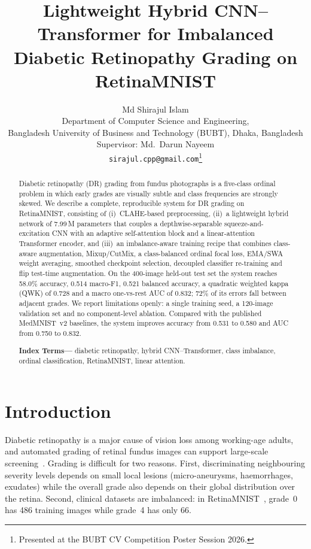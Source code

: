 \documentclass[10pt,twocolumn]{article}
\title{\vspace{-0.6em}\bfseries\fontsize{20}{23}\selectfont Lightweight Hybrid CNN--Transformer for Imbalanced Diabetic Retinopathy Grading on RetinaMNIST\vspace{-0.2em}}
\author{%
  \fontsize{11}{13}\selectfont Md Shirajul Islam\\[-1pt]
  \normalsize Department of Computer Science and Engineering,\\[-1pt]
  \normalsize Bangladesh University of Business and Technology (BUBT), Dhaka, Bangladesh\\[-1pt]
  \normalsize Supervisor: Md.\ Darun Nayeem\\[-1pt]
  \normalsize\texttt{sirajul.cpp@gmail.com}\thanks{Presented at the BUBT CV Competition Poster Session 2026.}}
\date{}
\begin{document}
\maketitle
\vspace{-1.2em}

\begin{abstract}
\noindent\small
Diabetic retinopathy (DR) grading from fundus photographs is a five-class ordinal problem in which early grades are visually subtle and class frequencies are strongly skewed. We describe a complete, reproducible system for DR grading on RetinaMNIST, consisting of (i)~CLAHE-based preprocessing, (ii)~a lightweight hybrid network of 7.99\,M parameters that couples a depthwise-separable squeeze-and-excitation CNN with an adaptive self-attention block and a linear-attention Transformer encoder, and (iii)~an imbalance-aware training recipe that combines class-aware augmentation, Mixup/CutMix, a class-balanced ordinal focal loss, EMA/SWA weight averaging, smoothed checkpoint selection, decoupled classifier re-training and flip test-time augmentation. On the 400-image held-out test set the system reaches 58.0\% accuracy, 0.514 macro-F1, 0.521 balanced accuracy, a quadratic weighted kappa (QWK) of 0.728 and a macro one-vs-rest AUC of 0.832; 72\% of its errors fall between adjacent grades. We report limitations openly: a single training seed, a 120-image validation set and no component-level ablation. Compared with the published MedMNIST~v2 baselines, the system improves accuracy from 0.531 to 0.580 and AUC from 0.750 to 0.832.
\par\smallskip
\noindent\textbf{\small Index Terms---} diabetic retinopathy, hybrid CNN--Transformer, class imbalance, ordinal classification, RetinaMNIST, linear attention.
\end{abstract}

\section{Introduction}
Diabetic retinopathy is a major cause of vision loss among working-age adults, and automated grading of retinal fundus images can support large-scale screening~\cite{gulshan}. Grading is difficult for two reasons. First, discriminating neighbouring severity levels depends on small local lesions (micro-aneurysms, haemorrhages, exudates) while the overall grade also depends on their global distribution over the retina. Second, clinical datasets are imbalanced: in RetinaMNIST~\cite{medmnistv2}, grade~0 has 486 training images while grade~4 has only 66.
\end{document}
